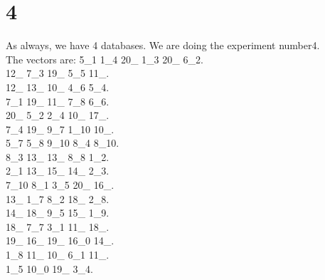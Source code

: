 \chapter{4}
\indent As always, we have 4 databases. We are doing the experiment number4.\\
The vectors are:
5\_1 1\_4 20\_ 1\_3 20\_ 6\_2.\\12\_ 7\_3 19\_ 5\_5 11\_.\\12\_ 13\_ 10\_ 4\_6 5\_4.\\7\_1 19\_ 11\_ 7\_8 6\_6.\\20\_ 5\_2 2\_4 10\_ 17\_.\\7\_4 19\_ 9\_7 1\_10 10\_.\\5\_7 5\_8 9\_10 8\_4 8\_10.\\8\_3 13\_ 13\_ 8\_8 1\_2.\\2\_1 13\_ 15\_ 14\_ 2\_3.\\7\_10 8\_1 3\_5 20\_ 16\_.\\13\_ 1\_7 8\_2 18\_ 2\_8.\\14\_ 18\_ 9\_5 15\_ 1\_9.\\18\_ 7\_7 3\_1 11\_ 18\_.\\19\_ 16\_ 19\_ 16\_0 14\_.\\1\_8 11\_ 10\_ 6\_1 11\_.\\1\_5 10\_0 19\_ 3\_4.\\
